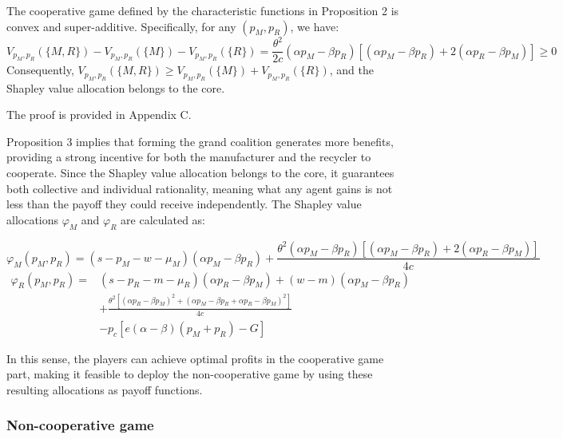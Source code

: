 \documentclass[authoryear,preprint,review,times,10pt]{elsarticle}
\begin{document}
\begin{prop}
\label{prop:convexity}
The cooperative game defined by the characteristic functions in Proposition 2 is convex and super-additive. Specifically, for any $(p_M, p_R)$, we have:
\begin{equation}
V_{p_M,p_R}(\{M,R\}) - V_{p_M,p_R}(\{M\}) - V_{p_M,p_R}(\{R\}) = \frac{\theta^2}{2c}(\alpha p_M - \beta p_R)[(\alpha p_M - \beta p_R) + 2(\alpha p_R - \beta p_M)] \geq 0
\end{equation}
Consequently, $V_{p_M,p_R}(\{M,R\}) \geq V_{p_M,p_R}(\{M\}) + V_{p_M,p_R}(\{R\})$, and the Shapley value allocation belongs to the core.
\end{prop}

 The proof is provided in Appendix C.

Proposition 3 implies that forming the grand coalition generates more benefits, providing a strong incentive for both the manufacturer and the recycler to cooperate. Since the Shapley value allocation belongs to the core, it guarantees both collective and individual rationality, meaning what any agent gains is not less than the payoff they could receive independently. The Shapley value allocations $\varphi_M$ and $\varphi_R$ are calculated as:

\begin{equation}
\varphi_M(p_M, p_R) = (s - p_M - w - \mu_M)(\alpha p_M - \beta p_R) + \frac{\theta^2(\alpha p_M - \beta p_R)[(\alpha p_M - \beta p_R) + 2(\alpha p_R - \beta p_M)]}{4c}
\end{equation}
\begin{equation}
\begin{aligned}
\varphi_R(p_M, p_R) =& (s - p_R - m - \mu_R)(\alpha p_R - \beta p_M) + (w - m)(\alpha p_M - \beta p_R) \\
&+ \frac{\theta^2[(\alpha p_R - \beta p_M)^2 + (\alpha p_M - \beta p_R + \alpha p_R - \beta p_M)^2]}{4c} \\
&- p_c[e(\alpha - \beta)(p_M + p_R) - G]
\end{aligned}
\end{equation}

In this sense, the players can achieve optimal profits in the cooperative game part, making it feasible to deploy the non-cooperative game by using these resulting allocations as payoff functions.

\subsubsection{Non-cooperative game}
\label{sec:noncooperative_game}
\end{document}
